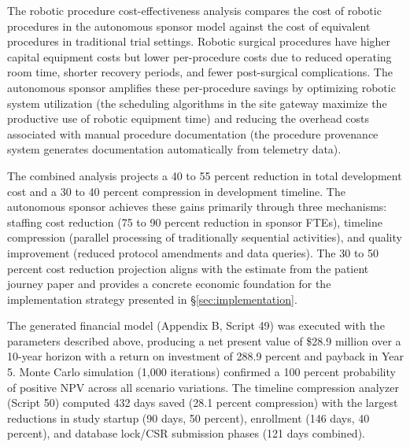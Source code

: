 The robotic procedure cost-effectiveness analysis compares the cost of robotic procedures
in the autonomous sponsor model against the cost of equivalent procedures in traditional
trial settings. Robotic surgical procedures have higher capital equipment costs but lower
per-procedure costs due to reduced operating room time, shorter recovery periods, and
fewer post-surgical complications. The autonomous sponsor amplifies these per-procedure
savings by optimizing robotic system utilization (the scheduling algorithms in the site
gateway maximize the productive use of robotic equipment time) and reducing the overhead
costs associated with manual procedure documentation (the procedure provenance system
generates documentation automatically from telemetry data).

The combined analysis projects a 40 to 55 percent reduction in total development cost
and a 30 to 40 percent compression in development timeline. The autonomous sponsor
achieves these gains primarily through three mechanisms: staffing cost reduction (75 to
90 percent reduction in sponsor FTEs), timeline compression (parallel processing of
traditionally sequential activities), and quality improvement (reduced protocol amendments
and data queries). The 30 to 50 percent cost reduction projection aligns with the
estimate from the patient journey paper \cite{patient-journey-paper} and provides a
concrete economic foundation for the implementation strategy presented in
\S\ref{sec:implementation}.

The generated financial model (Appendix B, Script 49) was executed with the parameters
described above, producing a net present value of \$28.9 million over a 10-year horizon
with a return on investment of 288.9 percent and payback in Year 5. Monte Carlo
simulation (1,000 iterations) confirmed a 100 percent probability of positive NPV across
all scenario variations. The timeline compression analyzer (Script 50) computed 432 days
saved (28.1 percent compression) with the largest reductions in study startup (90 days,
50 percent), enrollment (146 days, 40 percent), and database lock/CSR submission phases
(121 days combined).
